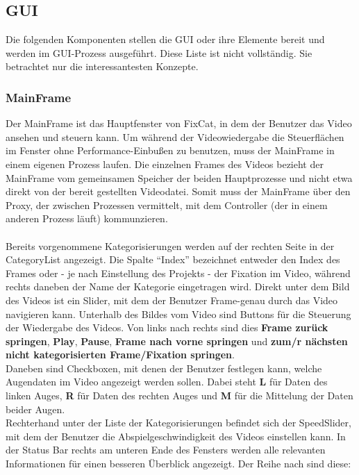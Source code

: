 \documentclass[a4paper,draft]{scrartcl}
\begin{document}
\subsection{GUI}
Die folgenden Komponenten stellen die GUI oder ihre Elemente bereit und werden im GUI-Prozess ausgef\"uhrt.
Diese Liste ist nicht vollst\"andig.
Sie betrachtet nur die interessantesten Konzepte.

\subsubsection{MainFrame}
Der MainFrame ist das Hauptfenster von FixCat, in dem der Benutzer das Video ansehen und steuern kann. Um während der Videowiedergabe die Steuerflächen im Fenster ohne Performance-Einbußen zu benutzen, muss der MainFrame in einem eigenen Prozess laufen. Die einzelnen Frames des Videos bezieht der MainFrame vom gemeinsamen Speicher der beiden Hauptprozesse und nicht etwa direkt von der bereit gestellten Videodatei. Somit muss der MainFrame über den Proxy, der zwischen Prozessen vermittelt, mit dem Controller (der in einem anderen Prozess läuft) kommunzieren. \\  \\
Bereits vorgenommene Kategorisierungen werden auf der rechten Seite in der CategoryList angezeigt. Die Spalte "`Index"' bezeichnet entweder den Index des Frames oder - je nach Einstellung des Projekts - der Fixation im Video, während rechts daneben der Name der Kategorie eingetragen wird. 
Direkt unter dem Bild des Videos ist ein Slider, mit dem der Benutzer Frame-genau durch das Video navigieren kann.
Unterhalb des Bildes vom Video sind Buttons für die Steuerung der Wiedergabe des Videos. Von links nach rechts sind dies \textbf{Frame zurück springen}, \textbf{Play}, \textbf{Pause}, \textbf{Frame nach vorne springen} und \textbf{zum/r nächsten nicht kategorisierten Frame/Fixation springen}. \\
Daneben sind Checkboxen, mit denen der Benutzer festlegen kann, welche Augendaten im Video angezeigt werden sollen. Dabei steht \textbf{L} für Daten des linken Auges, \textbf{R} für Daten des rechten Auges und \textbf{M} für die Mittelung der Daten beider Augen. \\
Rechterhand unter der Liste der Kategorisierungen befindet sich der SpeedSlider, mit dem der Benutzer die Abspielgeschwindigkeit des Videos einstellen kann. 
In der Status Bar rechts am unteren Ende des Fensters werden alle relevanten Informationen für einen besseren Überblick angezeigt. Der Reihe nach sind diese:
\end{document}
